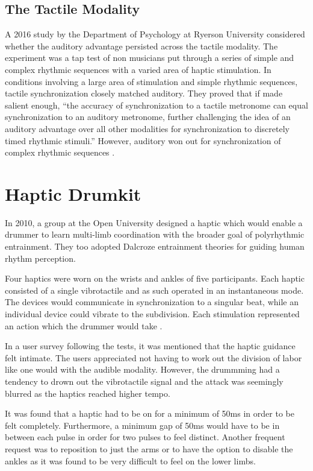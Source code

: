 \subsection{The Tactile Modality} \label{tactileModality}
A 2016 study by the Department of Psychology at Ryerson University considered whether the auditory advantage persisted across the tactile modality. The experiment was a tap test of non musicians put through a series of simple and complex rhythmic sequences with a varied area of haptic stimulation. In conditions involving a large area of stimulation and simple rhythmic sequences, tactile synchronization closely matched auditory. They proved that if made salient enough, “the accuracy of synchronization to a tactile metronome can equal synchronization to an auditory metronome, further challenging the idea of an auditory advantage over all other modalities for synchronization to discretely timed rhythmic stimuli.” However, auditory won out for synchronization of complex rhythmic sequences \cite{ammirante2016synchronizing}.

\section{Haptic Drumkit} \label{HD}
In 2010, a group at the Open University designed a haptic which would enable a drummer to learn multi-limb coordination with the broader goal of polyrhythmic entrainment. They too adopted Dalcroze entrainment theories for guiding human rhythm perception. 

Four haptics were worn on the wrists and ankles of five participants. Each haptic consisted of a single vibrotactile and as such operated in an instantaneous mode. The devices would communicate in synchronization to a singular beat, while an individual device could vibrate to the subdivision. Each stimulation represented an action which the drummer would take \cite{holland2010feeling}.

In a user survey following the tests, it was mentioned that the haptic guidance felt intimate. The users appreciated not having to work out the division of labor like one would with the audible modality. However, the drummming had a tendency to drown out the vibrotactile signal and the attack was seemingly blurred as the haptics reached higher tempo. 

It was found that a haptic had to be on for a minimum of 50ms in order to be felt completely. Furthermore, a minimum gap of 50ms would have to be in between each pulse in order for two pulses to feel distinct. Another frequent request was to reposition to just the arms or to have the option to disable the ankles as it was found to be very difficult to feel on the lower limbs.

